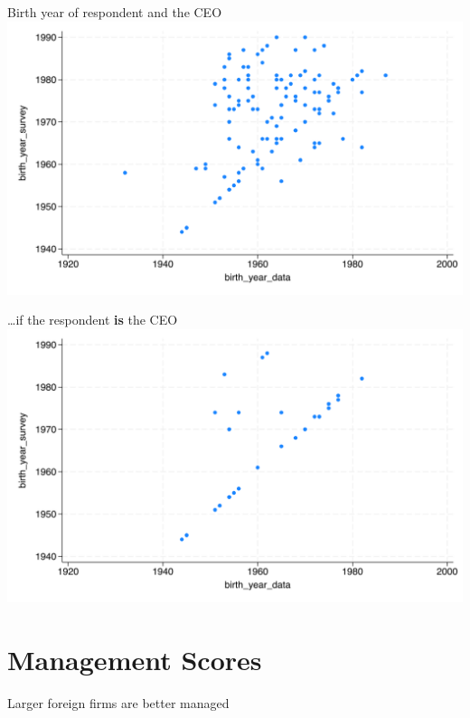 \documentclass[
  ignorenonframetext,
  aspectratio=1610,
]{beamer}
\begin{document}
\begin{frame}{Birth year of respondent and the CEO}
\protect\hypertarget{birth-year-of-respondent-and-the-ceo}{}
\includegraphics{fig/birth_year_validation.png}
\end{frame}

\begin{frame}{\ldots if the respondent \textbf{is} the CEO}
\protect\hypertarget{if-the-respondent-is-the-ceo}{}
\includegraphics{fig/birth_year_validation_cleaned.png}
\end{frame}

\section{Management Scores}\label{management-scores}

\begin{frame}{Larger foreign firms are better managed}
\protect\hypertarget{larger-foreign-firms-are-better-managed}{}

\end{frame}
\end{document}
